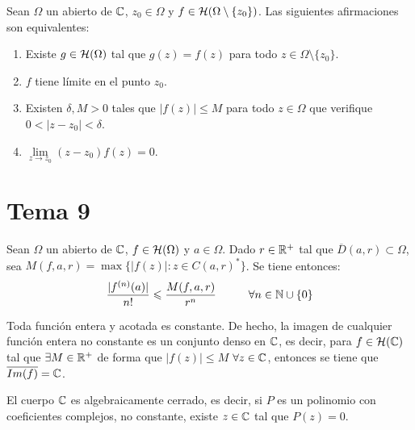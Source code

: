 \documentclass[12pt]{article}
\begin{document}
    \begin{teo}
        Sean $\Omega$ un abierto de $\mathbb{C}$, $z_0 \in \Omega$ y $f\in \mathcal{H}(\Omega\setminus \{z_0\})$. Las siguientes afirmaciones son equivalentes:
        \begin{enumerate}
            \item Existe $g\in \mathcal{H}(\Omega)$ tal que $g(z) = f(z)$ para todo $z\in \Omega \setminus \{z_0\}$.
            \item $f$ tiene límite en el punto $z_0$.
            \item Existen $\delta,M>0$ tales que $|f(z)|\leq M$ para todo $z \in \Omega$ que verifique $0 < |z - z_0| < \delta$.
            \item $\lim\limits_{z \to z_0} (z - z_0) f(z) = 0$.
        \end{enumerate}
    \end{teo}

    \newpage

    \section{Tema 9}

    \begin{prop} Sean $\Omega$ un abierto de $\mathbb{C}$, $f\in \mathcal{H}(\Omega)$ y $a\in \Omega$. Dado $r\in \mathbb{R}^+$ tal que $\overline{D}(a,r)\subset \Omega$, sea $M(f,a,r) = \max \{|f(z)|: z\in C(a,r)^*\}$. Se tiene entonces:
    \begin{gather*}
        \frac{|f^{(n)}(a)|}{n!} \leqslant \frac{M(f,a,r)}{r^n} \hspace{1cm} \forall n \in \mathbb{N}\cup \{0\}
    \end{gather*}       
    \end{prop}

    \begin{teo} Toda función entera y acotada es constante. De hecho, la imagen de cualquier función entera no constante es un conjunto denso en $\mathbb{C}$, es decir, para $f\in \mathcal{H}(\mathbb{C})$ tal que $\exists M\in \mathbb{R}^+$ de forma que $|f(z)| \leq M$ $\forall z \in \mathbb{C}$, entonces se tiene que $\overline{Im(f)} = \mathbb{C}$.
    \end{teo}

    \begin{teo} El cuerpo $\mathbb{C}$ es algebraicamente cerrado, es decir, si $P$ es un polinomio con coeficientes complejos, no constante, existe $z\in \mathbb{C}$ tal que $P(z) = 0$.
    \end{teo}
\end{document}
